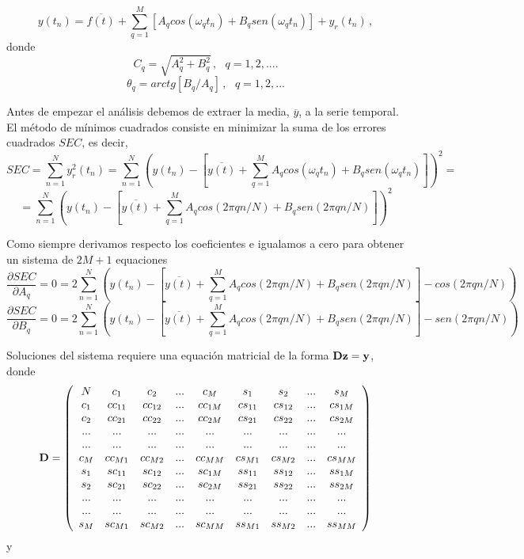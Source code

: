 \documentclass[
]{agujournal2019}
\begin{document}
\[y(t_n) = \overline{f(t)} + \sum\limits^{M}_{q=1}[A_q cos(\omega_q t_n)+B_q sen(\omega_q t_n)] +y_r(t_n)\,,\]
donde \[C_q=\sqrt{A_q^2+B_q^2}\,,\,\,\,\,q=1,2,....\]
\[\theta_q=arctg[B_q/A_q]\,,\,\,\,\,q=1,2,...\]

Antes de empezar el análisis debemos de extraer la media,
\(\overline{y}\), a la serie temporal. El método de mínimos cuadrados
consiste en minimizar la suma de los errores cuadrados \(SEC\), es
decir,
\[SEC= \sum\limits^N_{n=1} y_r^2(t_n) = \sum\limits^N_{n=1}  \left( y(t_n) - \left[ \overline{y(t)} +
 \sum\limits^{M}_{q=1} A_q cos(\omega_q t_n)+B_q sen(\omega_q t_n) \right] \right)^2 =\]
\[=\sum\limits^N_{n=1}  \left(y(t_n) - \left[ \overline{y(t)} +
\sum\limits^{M}_{q=1} A_q cos(2\pi q n/ N)+B_q sen(2\pi q n/ N) \right] \right)^2\]

Como siempre derivamos respecto los coeficientes e igualamos a cero para
obtener un sistema de \(2M+1\) equaciones
\[\frac{\partial{SEC}}{\partial{A_q}}=0=2\sum\limits^N_{n=1} \left(y(t_n) - \left[ \overline{y(t)} +
\sum\limits^{M}_{q=1} A_q cos(2\pi q n/ N)+B_q sen(2\pi q n/ N) \right]-cos(2\pi q n/ N) \right)\]
\[\frac{\partial{SEC}}{\partial{B_q}}=0=2\sum\limits^N_{n=1} \left(y(t_n) - \left[ \overline{y(t)} +
\sum\limits^{M}_{q=1} A_q cos(2\pi q n/ N)+B_q sen(2\pi q n/ N) \right]-sen(2\pi q n/ N) \right)\]

Soluciones del sistema requiere una equación matricial de la forma
\({\textbf D}{\textbf z}={\textbf y}\), donde
\[{\textbf D}=\left( \begin{array}{cccccccccccccc}
  N & c_1 & c_2 & ... & c_M & s_1 & s_2 & ... & s_M \\
  c_1 & cc_{11} & cc_{12} & ... & cc_{1M} & cs_{11} & cs_{12} & ... & cs_{1M} \\
  c_2 & cc_{21} & cc_{22} & ... & cc_{2M} & cs_{21} & cs_{22} & ... & cs_{2M} \\
  ... & ... & ... & ... & ... & ... & ... & ... & ... \\
  ... & ... & ... & ... & ... & ... & ... & ... & ... \\
  c_M & cc_{M1} & cc_{M2} & ... & cc_{MM} & cs_{M1} & cs_{M2} & ... & cs_{MM} \\
  s_1 & sc_{11} & sc_{12} & ... & sc_{1M} & ss_{11} & ss_{12} & ... & ss_{1M} \\
  s_2 & sc_{21} & sc_{22} & ... & sc_{2M} & ss_{21} & ss_{22} & ... & ss_{2M} \\
  ... & ... & ... & ... & ... & ... & ... & ... & ... \\
  ... & ... & ... & ... & ... & ... & ... & ... & ... \\
  s_M & sc_{M1} & sc_{M2} & ... & sc_{MM} & ss_{M1} & ss_{M2} & ... & ss_{MM} \\
      \end{array} \right)\] y
\end{document}
